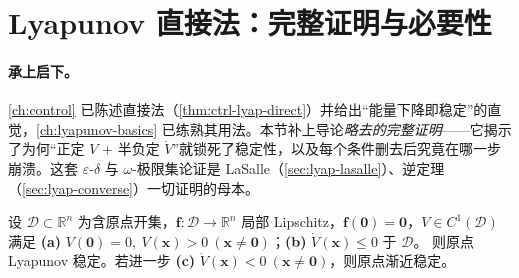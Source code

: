 \section{Lyapunov 直接法：完整证明与必要性}
\label{sec:lyap-direct}

\paragraph{承上启下。}
\cref{ch:control} 已陈述直接法（\cref{thm:ctrl-lyap-direct}）并给出“能量下降即稳定”的直觉，\cref{ch:lyapunov-basics} 已练熟其用法。本节补上导论\emph{略去的完整证明}——它揭示了为何“正定 $V$ + 半负定 $\dot V$”就锁死了稳定性，以及每个条件删去后究竟在哪一步崩溃。这套 $\varepsilon$-$\delta$ 与 $\omega$-极限集论证是 LaSalle（\cref{sec:lyap-lasalle}）、逆定理（\cref{sec:lyap-converse}）一切证明的母本。

\begin{theorem}
\label{thm:lyap-direct-full}
设 $\mathcal{D}\subset\mathbb{R}^n$ 为含原点开集，$\mathbf{f}:\mathcal{D}\to\mathbb{R}^n$ 局部 Lipschitz，$\mathbf{f}(\mathbf{0})=\mathbf{0}$，$V\in C^1(\mathcal{D})$ 满足
\textbf{(a)} $V(\mathbf{0})=0,\ V(\mathbf{x})>0\ (\mathbf{x}\neq\mathbf{0})$；\textbf{(b)} $\dot V(\mathbf{x})\le0$ 于 $\mathcal{D}$。
则原点 Lyapunov 稳定。若进一步 \textbf{(c)} $\dot V(\mathbf{x})<0\ (\mathbf{x}\neq\mathbf{0})$，则原点渐近稳定。
\end{theorem}

